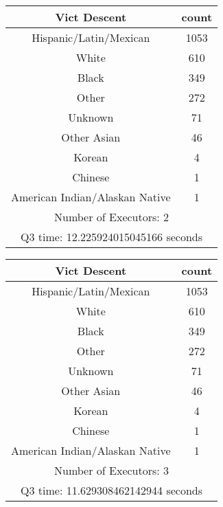 \documentclass{article}
\begin{document}
\begin{center}
\noindent %
\begin{tabular}[t]{|c|c|}
\hline
\textbf{Vict Descent} & \textbf{count} \\
\hline
Hispanic/Latin/Mexican & 1053 \\
White & 610 \\
Black & 349 \\
Other & 272 \\
Unknown & 71 \\
Other Asian & 46 \\
Korean & 4 \\
Chinese & 1 \\
American Indian/Alaskan Native & 1 \\
\hline
\multicolumn{2}{|c|}{Number of Executors: 2} \\
\multicolumn{2}{|c|}{Q3 time: 12.225924015045166 seconds} \\
\hline
\end{tabular}
\hspace{5mm} %
\begin{tabular}[t]{|c|c|}
\hline
\textbf{Vict Descent} & \textbf{count} \\
\hline
Hispanic/Latin/Mexican & 1053 \\
White & 610 \\
Black & 349 \\
Other & 272 \\
Unknown & 71 \\
Other Asian & 46 \\
Korean & 4 \\
Chinese & 1 \\
American Indian/Alaskan Native & 1 \\
\hline
\multicolumn{2}{|c|}{Number of Executors: 3} \\
\multicolumn{2}{|c|}{Q3 time: 11.629308462142944 seconds} \\
\hline
\end{tabular}
\end{center}

\vspace{3mm} %
\end{document}
